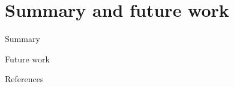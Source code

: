 \documentclass[14pt]{beamer}
\begin{document}
\section*{Summary and future work}

\begin{frame}{Summary}
\end{frame}

\begin{frame}{Future work}
\end{frame}

\appendix

\begin{frame}[allowframebreaks]{References}
\scriptsize


\end{frame}
\end{document}

